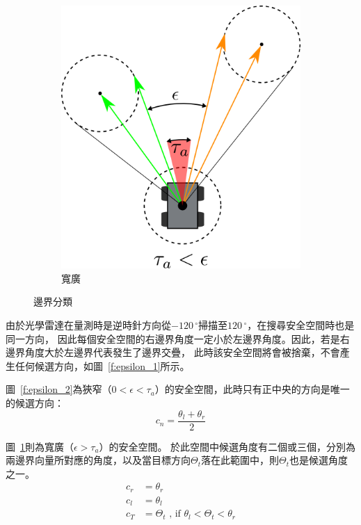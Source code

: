 \begin{figure}[h!]
\begin{subfigure}[t]{0.4\textwidth}
		\includegraphics[width=\textwidth]{figures/algorithm/epsilon_situation_3}
		\caption{寬廣}
		\label{f:epsilon_3}
	\end{subfigure}
	\caption{邊界分類}
	\label{f:epsilon_situation}
\end{figure}

由於光學雷達在量測時是逆時針方向從$-120\,^{\circ}$掃描至$120\,^{\circ}$，在搜尋安全空間時也是同一方向，
因此每個安全空間的右邊界角度一定小於左邊界角度。因此，若是右邊界角度大於左邊界代表發生了邊界交疊，
此時該安全空間將會被捨棄，不會產生任何候選方向，如圖~\ref{f:epsilon_1}所示。

圖~\ref{f:epsilon_2}為狹窄（$0 < \epsilon < \tau_a$）的安全空間，此時只有正中央的方向是唯一的候選方向：
\begin{equation}
	c_n = \frac{\theta_l + \theta_r}{2}
\end{equation}

圖~\ref{f:epsilon_3}則為寬廣（$\epsilon > \tau_a$）的安全空間。
於此空間中候選角度有二個或三個，分別為兩邊界向量所對應的角度，以及當目標方向$\Theta_t$落在此範圍中，則$\Theta_t$也是候選角度之一。
\begin{align}
	c_r &= \theta_r \nonumber \\
	c_l &= \theta_l \nonumber \\
	c_T &= \Theta_t \text{ , if } \theta_l < \Theta_t < \theta_r 
\end{align}

